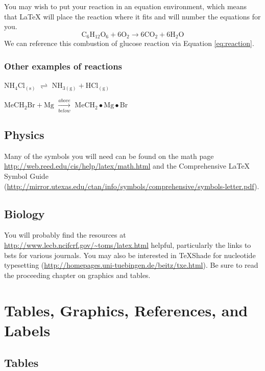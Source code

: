\documentclass[ms]{uncgdissertationexp}
\theoremstyle{plain}
\theoremstyle{definition}
\theoremstyle{remark}
\begin{document}
  You may wish to put your reaction in an equation environment, which
  means that LaTeX will place the reaction where it fits and will number
  the equations for you.
  \begin{equation}
    \mathrm{C_6H_{12}O_6  + 6O_2} \longrightarrow \mathrm{6CO_2 + 6H_2O}
    \label{eq:reaction}
  \end{equation}
  We can reference this combustion of glucose reaction via Equation
  \eqref{eq:reaction}.
  
  \subsection{Other examples of
  reactions}\label{other-examples-of-reactions}
  
  \(\mathrm{NH_4Cl_{(s)}}\) \(\rightleftharpoons\)
  \(\mathrm{NH_{3(g)}+HCl_{(g)}}\)
  
  \noindent \(\mathrm{MeCH_2Br + Mg}\) \(\xrightarrow[below]{above}\)
  \(\mathrm{MeCH_2\bullet Mg \bullet Br}\)
  
  \section{Physics}\label{physics}
  
  Many of the symbols you will need can be found on the math page
  \url{http://web.reed.edu/cis/help/latex/math.html} and the Comprehensive
  LaTeX Symbol Guide
  (\url{http://mirror.utexas.edu/ctan/info/symbols/comprehensive/symbols-letter.pdf}).
  
  \section{Biology}\label{biology}
  
  You will probably find the resources at
  \url{http://www.lecb.ncifcrf.gov/~toms/latex.html} helpful, particularly
  the links to bsts for various journals. You may also be interested in
  TeXShade for nucleotide typesetting
  (\url{http://homepages.uni-tuebingen.de/beitz/txe.html}). Be sure to
  read the proceeding chapter on graphics and tables.
  
  \chapter{Tables, Graphics, References, and Labels}\label{ref-labels}
  
  \section{Tables}\label{tables}
  
\end{document}
